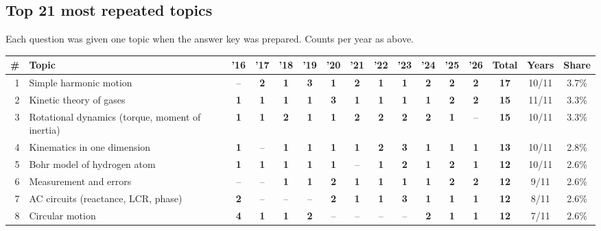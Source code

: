 \documentclass[10pt,a4paper]{article}
\begin{document}
\subsection*{Top 21 most repeated topics}
{\small Each question was given one topic when the answer key was prepared. Counts per year as above.}\par\smallskip
{\footnotesize\setlength{\tabcolsep}{2.6pt}\renewcommand{\arraystretch}{1.2}
\begin{tabularx}{\linewidth}{@{}r>{\raggedright\arraybackslash}X*{11}{c}ccc@{}}\toprule
\# & Topic & '16 & '17 & '18 & '19 & '20 & '21 & '22 & '23 & '24 & '25 & '26 & Total & Years & Share\\\midrule
1 & Simple harmonic motion & {\color{gray!60}--} & \textbf{2} & \textbf{1} & \textbf{3} & \textbf{1} & \textbf{2} & \textbf{1} & \textbf{1} & \textbf{2} & \textbf{2} & \textbf{2} & \textbf{17} & 10/11 & 3.7\%\\
2 & Kinetic theory of gases & \textbf{1} & \textbf{1} & \textbf{1} & \textbf{1} & \textbf{3} & \textbf{1} & \textbf{1} & \textbf{1} & \textbf{1} & \textbf{2} & \textbf{2} & \textbf{15} & 11/11 & 3.3\%\\
3 & Rotational dynamics (torque, moment of inertia) & \textbf{1} & \textbf{1} & \textbf{2} & \textbf{1} & \textbf{1} & \textbf{2} & \textbf{2} & \textbf{2} & \textbf{2} & \textbf{1} & {\color{gray!60}--} & \textbf{15} & 10/11 & 3.3\%\\
4 & Kinematics in one dimension & \textbf{1} & {\color{gray!60}--} & \textbf{1} & \textbf{1} & \textbf{1} & \textbf{1} & \textbf{2} & \textbf{3} & \textbf{1} & \textbf{1} & \textbf{1} & \textbf{13} & 10/11 & 2.8\%\\
5 & Bohr model of hydrogen atom & \textbf{1} & \textbf{1} & \textbf{1} & \textbf{1} & \textbf{1} & {\color{gray!60}--} & \textbf{1} & \textbf{2} & \textbf{1} & \textbf{2} & \textbf{1} & \textbf{12} & 10/11 & 2.6\%\\
6 & Measurement and errors & {\color{gray!60}--} & {\color{gray!60}--} & \textbf{1} & \textbf{1} & \textbf{2} & \textbf{1} & \textbf{1} & \textbf{1} & \textbf{1} & \textbf{2} & \textbf{2} & \textbf{12} & 9/11 & 2.6\%\\
7 & AC circuits (reactance, LCR, phase) & \textbf{2} & {\color{gray!60}--} & {\color{gray!60}--} & {\color{gray!60}--} & \textbf{2} & \textbf{1} & \textbf{1} & \textbf{3} & \textbf{1} & \textbf{1} & \textbf{1} & \textbf{12} & 8/11 & 2.6\%\\
8 & Circular motion & \textbf{4} & \textbf{1} & \textbf{1} & \textbf{2} & {\color{gray!60}--} & {\color{gray!60}--} & {\color{gray!60}--} & {\color{gray!60}--} & \textbf{2} & \textbf{1} & \textbf{1} & \textbf{12} & 7/11 & 2.6\%\\

\end{tabularx}}
\end{document}
